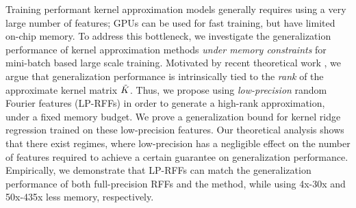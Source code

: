 
Training performant kernel approximation models generally requires using a very large number of features; GPUs can be used for fast training, but have limited on-chip memory. To address this bottleneck, we investigate the generalization performance of kernel approximation methods \emph{under memory constraints} for mini-batch based large scale training. Motivated by recent theoretical work \citep{avron17,musco17}, we argue that generalization performance is intrinsically tied to the \emph{rank} of the approximate kernel matrix $\tilde{K}$. Thus, we propose using \emph{low-precision} random Fourier features (LP-RFFs) in order to generate a high-rank approximation, under a fixed memory budget. We prove a generalization bound for kernel ridge regression trained on these low-precision features. Our theoretical analysis shows that there exist regimes, where low-precision has a negligible effect on the number of features required to achieve a certain guarantee on generalization performance. Empirically, we demonstrate that LP-RFFs can match the generalization performance of both full-precision RFFs and the \Nystrom method, while using 4x-30x and 50x-435x less memory, respectively.
